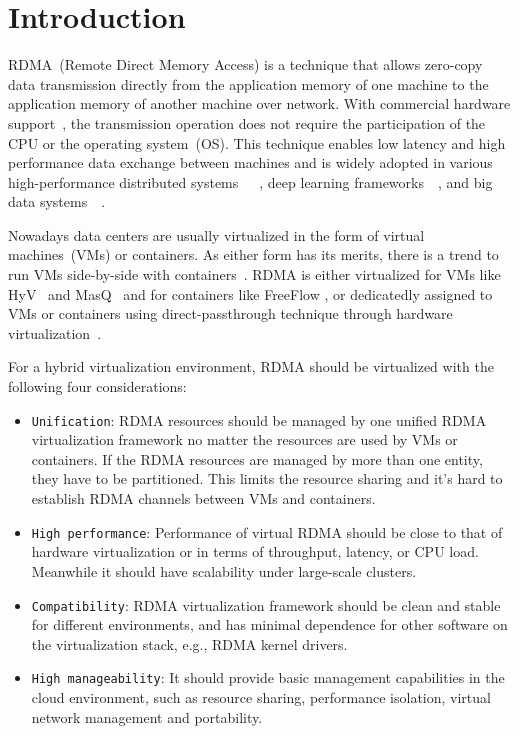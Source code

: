 \section{Introduction}
RDMA~(Remote Direct Memory Access) is a technique that allows zero-copy data transmission directly from the application memory of one machine to the application memory of another machine over network. With commercial hardware support~\cite{roce, iwarp, infiniband}, the transmission operation does not require the participation of the CPU or the operating system~(OS). This technique enables low latency and high performance data exchange between machines and is widely adopted in various high-performance distributed systems~\cite{dragojevic2014farm}~\cite{wei2015fast}~\cite{lu2017octopus}, deep learning frameworks~\cite{abadi2016tensorflow}~\cite{chen2015mxnet}, and big data systems~\cite{spark-rdma}~\cite{hadoop-rdma}.

Nowadays data centers are usually virtualized in the form of virtual machines~(VMs) or containers. As either form has its merits, there is a trend to run VMs side-by-side with containers~\cite{rethinkingvirtualization}. RDMA is either virtualized for VMs like HyV~\cite{pfefferle2015hybrid} and MasQ~\cite{he2020masq} and for containers like FreeFlow \cite{kim2019freeflow}, or dedicatedly assigned to VMs or containers using direct-passthrough technique through hardware virtualization~\cite{sr-iov}.

For a hybrid virtualization environment, RDMA should be virtualized with the following four considerations:

\begin{itemize}
	\item {\verb|Unification|}: RDMA resources should be managed by one unified RDMA virtualization framework no matter the resources are used by VMs or containers. If the RDMA resources are managed by more than one entity, they have to be partitioned. This limits the resource sharing and it's hard to establish RDMA channels between VMs and containers.
	\item {\verb|High performance|}: Performance of virtual RDMA should be close to that of hardware virtualization or \native in terms of throughput, latency, or CPU load. Meanwhile it should have scalability under large-scale clusters.
	\item {\verb|Compatibility|}: RDMA virtualization framework should be clean and stable for different environments, and has minimal dependence for other software on the virtualization stack, e.g., RDMA kernel drivers.
	\item {\verb|High manageability|}: It should provide basic management capabilities in the cloud environment, such as resource sharing, performance isolation, virtual network management and portability.
\end{itemize}

